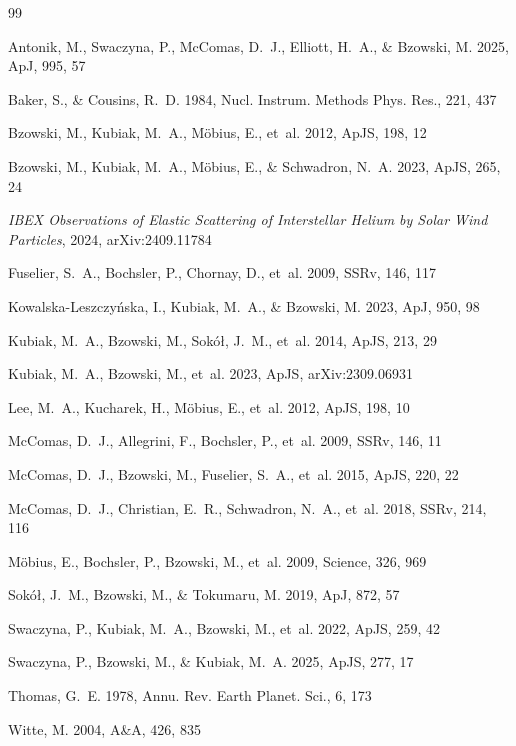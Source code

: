 \documentclass[10pt,a4paper,twocolumn]{article}
\begin{document}
{\small
\begin{thebibliography}{99}
\providecommand{\natexlab}[1]{#1}

Antonik, M., Swaczyna, P., McComas, D.~J., Elliott, H.~A., \& Bzowski, M.
  2025, ApJ, 995, 57

Baker, S., \& Cousins, R.~D. 1984, Nucl. Instrum. Methods Phys. Res., 221, 437

Bzowski, M., Kubiak, M.~A., M\"obius, E., et~al. 2012, ApJS, 198, 12

Bzowski, M., Kubiak, M.~A., M\"obius, E., \& Schwadron, N.~A. 2023, ApJS,
  265, 24

\textit{IBEX Observations of Elastic Scattering of Interstellar Helium by
  Solar Wind Particles}, 2024, arXiv:2409.11784

Fuselier, S.~A., Bochsler, P., Chornay, D., et~al. 2009, SSRv, 146, 117

Kowalska-Leszczy\'nska, I., Kubiak, M.~A., \& Bzowski, M. 2023, ApJ, 950, 98

Kubiak, M.~A., Bzowski, M., Sok\'o\l, J.~M., et~al. 2014, ApJS, 213, 29

Kubiak, M.~A., Bzowski, M., et~al. 2023, ApJS, arXiv:2309.06931

Lee, M.~A., Kucharek, H., M\"obius, E., et~al. 2012, ApJS, 198, 10

McComas, D.~J., Allegrini, F., Bochsler, P., et~al. 2009, SSRv, 146, 11

McComas, D.~J., Bzowski, M., Fuselier, S.~A., et~al. 2015, ApJS, 220, 22

McComas, D.~J., Christian, E.~R., Schwadron, N.~A., et~al. 2018, SSRv, 214,
  116

M\"obius, E., Bochsler, P., Bzowski, M., et~al. 2009, Science, 326, 969

Sok\'o\l, J.~M., Bzowski, M., \& Tokumaru, M. 2019, ApJ, 872, 57

Swaczyna, P., Kubiak, M.~A., Bzowski, M., et~al. 2022, ApJS, 259, 42

Swaczyna, P., Bzowski, M., \& Kubiak, M.~A. 2025, ApJS, 277, 17

Thomas, G.~E. 1978, Annu. Rev. Earth Planet. Sci., 6, 173

Witte, M. 2004, A\&A, 426, 835

\end{thebibliography}
}
\end{document}
